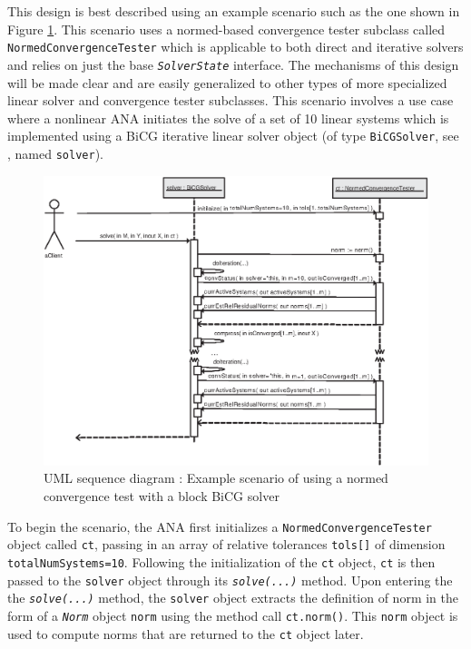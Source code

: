 This design is best described using an example scenario such as the
one shown in Figure \ref{tsfcorenonlin:fig:ConvergenceTesterSeqNormed}.  This
scenario uses a normed-based convergence tester subclass called
\texttt{NormedConvergenceTester} which is applicable to both direct and
iterative solvers and relies on just the base
\texttt{\textit{Solver\-State}} interface.  The mechanisms of
this design will be made clear and are easily generalized to other
types of more specialized linear solver and convergence tester
subclasses.  This scenario involves a use case where a nonlinear ANA
initiates the solve of a set of 10 linear systems which is implemented
using a BiCG iterative linear solver object (of type
\texttt{BiCG\-Solver}, see \cite{ref:TSFCore}, named \texttt{solver}).

{\bsinglespace
\begin{figure}[t]
\begin{center}
\includegraphics*[bb= 0.0in 0.0in 7.0in 5.15in,angle=0,scale=0.70
]{ConvergenceTesterSeqNormed}
\end{center}
\caption{
\label{tsfcorenonlin:fig:ConvergenceTesterSeqNormed}
UML sequence diagram : Example scenario of using a normed convergence test with a block BiCG solver
}
\end{figure}
\esinglespace}

To begin the scenario, the ANA first initializes a
\texttt{NormedConvergenceTester} object called \texttt{ct}, passing in an
array of relative tolerances
\texttt{tols[]} of dimension \texttt{totalNumSystems=10}.
Following the initialization of the \texttt{ct} object, \texttt{ct} is
then passed to the \texttt{solver} object through its
\texttt{\textit{solve(...)}} method.  Upon entering the the
\texttt{\textit{solve(...)}} method, the \texttt{solver} object
extracts the definition of norm in the form of a
\texttt{\textit{Norm}} object \texttt{norm} using the method call
\texttt{ct.norm()}.  This \texttt{norm} object is used to compute
norms that are returned to the \texttt{ct} object later.

